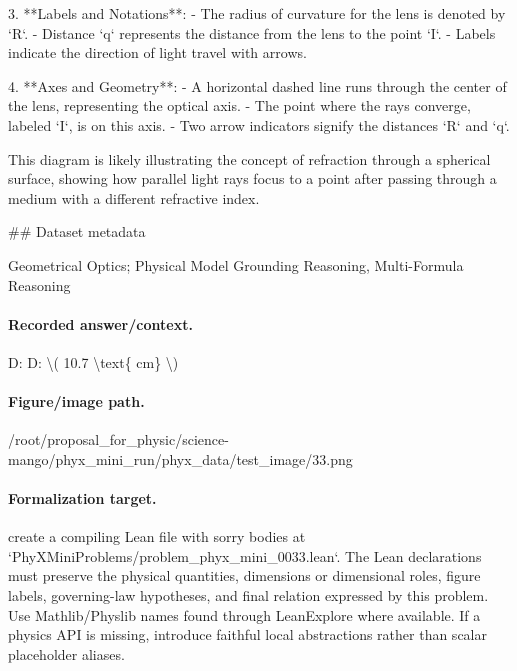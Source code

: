 3. **Labels and Notations**:
   - The radius of curvature for the lens is denoted by `R`.
   - Distance `q` represents the distance from the lens to the point `I`.
   - Labels indicate the direction of light travel with arrows.

4. **Axes and Geometry**:
   - A horizontal dashed line runs through the center of the lens, representing the optical axis.
   - The point where the rays converge, labeled `I`, is on this axis.
   - Two arrow indicators signify the distances `R` and `q`.

This diagram is likely illustrating the concept of refraction through a spherical surface, showing how parallel light rays focus to a point after passing through a medium with a different refractive index.

\#\# Dataset metadata

Geometrical Optics; Physical Model Grounding Reasoning, Multi-Formula Reasoning

\paragraph{Recorded answer/context.}
D: D: \textbackslash{}( 10.7 \textbackslash{}text\{ cm\} \textbackslash{})

\paragraph{Figure/image path.}
/root/proposal\_for\_physic/science-mango/phyx\_mini\_run/phyx\_data/test\_image/33.png

\paragraph{Formalization target.}
create a compiling Lean file with sorry bodies at `PhyXMiniProblems/problem\_phyx\_mini\_0033.lean`. The Lean declarations must preserve the physical quantities, dimensions or dimensional roles, figure labels, governing-law hypotheses, and final relation expressed by this problem.
Use Mathlib/Physlib names found through LeanExplore where available. If a physics API is missing, introduce faithful local abstractions rather than scalar placeholder aliases.


